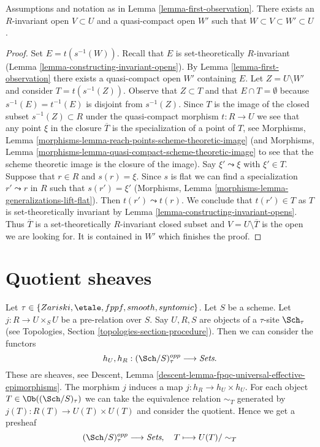 \begin{lemma}
\label{lemma-second-observation}
Assumptions and notation as in Lemma \ref{lemma-first-observation}.
There exists an $R$-invariant open $V \subset U$ and a quasi-compact
open $W'$ such that $W \subset V \subset W' \subset U$.
\end{lemma}

\begin{proof}
Set $E = t(s^{-1}(W))$. Recall that $E$ is set-theoretically $R$-invariant
(Lemma \ref{lemma-constructing-invariant-opens}).
By Lemma \ref{lemma-first-observation} there exists a quasi-compact
open $W'$ containing $E$. Let $Z = U \setminus W'$ and consider
$T = t(s^{-1}(Z))$. Observe that $Z \subset T$ and that
$E \cap T = \emptyset$ because $s^{-1}(E) = t^{-1}(E)$ is disjoint
from $s^{-1}(Z)$. Since $T$ is the image of the closed subset
$s^{-1}(Z) \subset R$ under the quasi-compact morphism $t : R \to U$
we see that any point $\xi$ in the closure $\overline{T}$
is the specialization of a point of $T$, see
Morphisms, Lemma \ref{morphisms-lemma-reach-points-scheme-theoretic-image} (and
Morphisms, Lemma \ref{morphisms-lemma-quasi-compact-scheme-theoretic-image}
to see that the scheme theoretic image is the closure of the image).
Say $\xi' \leadsto \xi$ with $\xi' \in T$. Suppose that $r \in R$ and
$s(r) = \xi$. Since $s$ is flat we can find a specialization $r' \leadsto r$
in $R$ such that $s(r') = \xi'$
(Morphisms, Lemma \ref{morphisms-lemma-generalizations-lift-flat}).
Then $t(r') \leadsto t(r)$. We conclude that $t(r') \in T$ as $T$
is set-theoretically invariant by
Lemma \ref{lemma-constructing-invariant-opens}.
Thus $\overline{T}$ is a set-theoretically $R$-invariant closed subset
and $V = U \setminus \overline{T}$ is the open we are
looking for. It is contained in $W'$ which finishes the proof.
\end{proof}




\section{Quotient sheaves}
\label{section-quotient-sheaves}

\noindent
Let $\tau \in \{Zariski, \etale, fppf, smooth, syntomic\}$.
Let $S$ be a scheme.
Let $j : R \to U \times_S U$ be a pre-relation over $S$.
Say $U, R, S$ are objects of a $\tau$-site $\Sch_\tau$
(see Topologies, Section \ref{topologies-section-procedure}).
Then we can consider the functors
$$
h_U, h_R :
(\Sch/S)_\tau^{opp}
\longrightarrow
\textit{Sets}.
$$
These are sheaves, see
Descent, Lemma \ref{descent-lemma-fpqc-universal-effective-epimorphisms}.
The morphism $j$ induces a map $j : h_R \to h_U \times h_U$.
For each object $T \in \Ob((\Sch/S)_\tau)$
we can take the equivalence relation $\sim_T$ generated by
$j(T) : R(T) \to U(T) \times U(T)$ and consider the quotient.
Hence we get a presheaf
\begin{equation}
\label{equation-quotient-presheaf}
(\Sch/S)_\tau^{opp}
\longrightarrow
\textit{Sets}, \quad
T \longmapsto U(T)/\sim_T
\end{equation}

